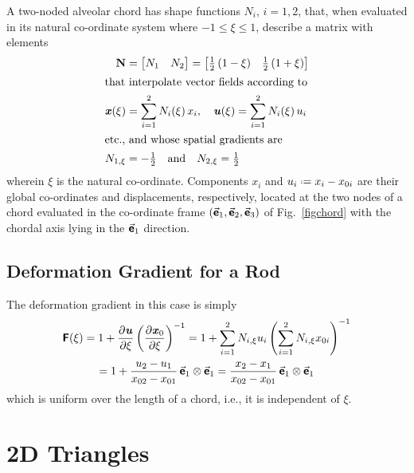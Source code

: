 A two-noded alveolar chord has shape functions $N_i$, $i=1,2$, that, when evaluated in its natural co-ordinate system where $-1 \leq \xi \leq 1$, describe a matrix with elements
\begin{subequations}
    \begin{align}
\mathbf{N} & = \begin{bmatrix} N_1 & N_2 \end{bmatrix} =
\begin{bmatrix}
\frac{1}{2} \, (1 - \xi) &  \frac{1}{2} \, (1 + \xi)
\end{bmatrix} \\
\intertext{that interpolate vector fields according to}
\boldsymbol{\mathit{x}} ( \xi ) & = \sum_{i=1}^2 N_i ( \xi ) \, x_i , \quad
\boldsymbol{\mathit{u}} ( \xi ) = \sum_{i=1}^2 N_i ( \xi ) \, u_i  \\
\intertext{etc., and whose spatial gradients are} 
N_{1,\xi} & = -\tfrac{1}{2} 
\quad \text{and} \quad
N_{2,\xi} = \tfrac{1}{2}
\end{align}
\end{subequations}
wherein $\xi$ is the natural co-ordinate.  Components $x_i$ and $u_i \defeq x_i - x_{0i}$ are their global co-ordinates and displacements, respectively, located at the two nodes of a chord evaluated in the co-ordinate frame $( \vec{\boldsymbol{\mathsf{e}}}_1 , \vec{\boldsymbol{\mathsf{e}}}_2 , \vec{\boldsymbol{\mathsf{e}}}_3 )$ of Fig.~\ref{figchord} with the chordal axis lying in the $\vec{\boldsymbol{\mathsf{e}}}_1$ direction.

\subsection{Deformation Gradient for a Rod}

The deformation gradient in this case is simply
\begin{multline}
    \boldsymbol{\mathsf{F}} ( \xi ) = 1 + \frac{\partial \boldsymbol{\mathit{u}}}{\partial \xi} 
    \left( \frac{\partial \boldsymbol{\mathit{x}}_0 }{\partial \xi} \right)^{-1} = 
    1 + \sum_{i=1}^2 N_{i,\xi} u_i \left( \sum_{i=1}^2 N_{i,\xi} x_{0i} \right)^{-1} \\
    = 1 + \frac{u_2 - u_1}{x_{02} - x_{01}} \, \vec{\boldsymbol{\mathsf{e}}}_1 \otimes \vec{\boldsymbol{\mathsf{e}}}_1 = \frac{x_2 - x_1}{x_{02} - x_{01}} \, \vec{\boldsymbol{\mathsf{e}}}_1 \otimes \vec{\boldsymbol{\mathsf{e}}}_1
\end{multline}
which is uniform over the length of a chord, i.e., it is independent of $\xi$.

\section{2D Triangles}

